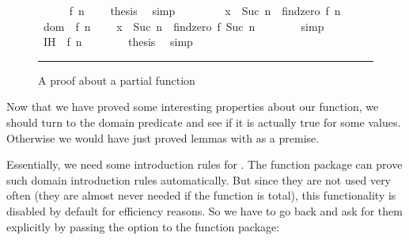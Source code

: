 \begin{isabellebody}
\begin{figure}
\begin{minipage}{0.8\textwidth}
\ \ \ \ \isamarkupfalse%
\ {\isacharbackquoteopen}f\ n\ {\isasymnoteq}\ {}{\isacharbackquoteclose}\ \isamarkupfalse%
\ {\isacharquery}thesis\ \isamarkupfalse%
\ simp\isanewline
\ \ \isamarkupfalse%
\isanewline
\ \ \ \ \isamarkupfalse%
\ {\isachardoublequoteopen}x\ {\isasymin}\ {\isacharbraceleft}Suc\ n\ {\isachardot}{\isachardot}{\isacharless}\ findzero\ f\ n{\isacharbraceright}{\isachardoublequoteclose}\isanewline
\ \ \ \ \isamarkupfalse%
\ dom\ \ {\isacharbackquoteopen}f\ n\ {\isasymnoteq}\ {}{\isacharbackquoteclose}\ \isamarkupfalse%
\ {\isachardoublequoteopen}x\ {\isasymin}\ {\isacharbraceleft}Suc\ n\ {\isachardot}{\isachardot}{\isacharless}\ findzero\ f\ {\isacharparenleft}Suc\ n{\isacharparenright}{\isacharbraceright}{\isachardoublequoteclose}\isanewline
\ \ \ \ \ \ \isamarkupfalse%
\ simp\isanewline
\ \ \ \ \isamarkupfalse%
\ IH\ \ {\isacharbackquoteopen}f\ n\ {\isasymnoteq}\ {}{\isacharbackquoteclose}\isanewline
\ \ \ \ \isamarkupfalse%
\ {\isacharquery}thesis\ \isamarkupfalse%
\ simp\isanewline
\ \ \isamarkupfalse%
\isanewline
{}\isamarkupfalse%
%
\endisatagproof
{\isafoldproof}%
%
\isadelimproof
%
\endisadelimproof
%
\isamarkupfalse{}
\end{minipage}\vspace{6pt}\hrule
\caption{A proof about a partial function}\label{findzero_isar}
\end{figure}
%
\isamarkuptrue%
%
\begin{isamarkuptext}%
Now that we have proved some interesting properties about our
  function, we should turn to the domain predicate and see if it is
  actually true for some values. Otherwise we would have just proved
  lemmas with  as a premise.

  Essentially, we need some introduction rules for . The function package can prove such domain
  introduction rules automatically. But since they are not used very
  often (they are almost never needed if the function is total), this
  functionality is disabled by default for efficiency reasons. So we have to go
  back and ask for them explicitly by passing the  option to the function package:


\end{isamarkuptext}
\end{isabellebody}
